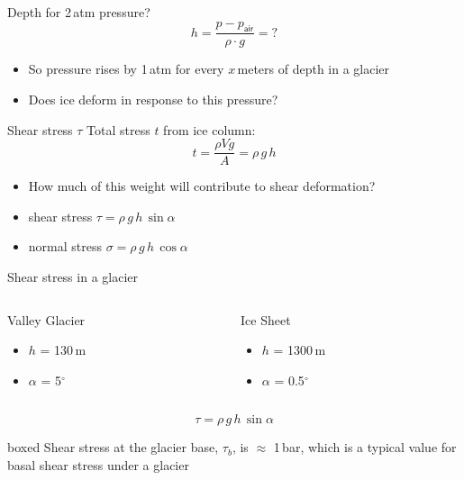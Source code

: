 \documentclass[hide notes,intlimits,unknownkeysallowed]{beamer}
\begin{document}
\begin{frame}{Depth for 2\,atm pressure?}
    \begin{displaymath}
       h = \frac{p-p_{\textsf{air}}}{\rho\cdot g} = ?
     \end{displaymath}
     \begin{itemize}
     \item  So pressure rises by 1\,atm for every \alert{$x$}\,meters of depth in a glacier
     \item Does ice deform in response to this pressure?
     \end{itemize}
\end{frame}


\begin{frame}{Shear stress $\tau$}
  Total stress $t$ from ice column:
    \begin{displaymath}
       t = \frac{\rho V g}{A} = \rho\,g\,h
     \end{displaymath}
     \begin{itemize}
     \item How much of this weight will contribute to shear deformation?
     \item shear stress $\tau = \rho\,g\,h\,\sin{\alpha}$
     \item normal stress $\sigma = \rho\,g\,h\,\cos{\alpha}$
    \end{itemize}
\end{frame}


\begin{frame}{Shear stress in a glacier}
\begin{columns}[c]
  \begin{column}{.5\textwidth}
    \begin{block}{Valley Glacier}
      \begin{itemize}
      \item $h$ = 130\,m
      \item $\alpha$ = 5$^{\circ}$
      \end{itemize}
    \end{block}
  \end{column}
  \begin{column}{.5\textwidth}
    \begin{block}{Ice Sheet}
  \begin{itemize}
  \item $h$ = 1300\,m
  \item $\alpha$ = 0.5$^{\circ}$
  \end{itemize}
\end{block}
\end{column}
\end{columns}
\vspace{1em}
\begin{displaymath}
    \tau = \rho\,g\,h\,\sin{\alpha}
  \end{displaymath}
  \begin{beamercolorbox}[rounded=true,shadow=true]{boxed}
    Shear stress at the glacier base, $\tau_{b}$, is $\approx$ 1\,bar, which is a typical value for basal shear stress under a glacier
  \end{beamercolorbox}
\end{frame}
   
\end{document}
